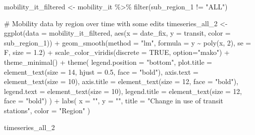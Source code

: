 \documentclass[
  letterpaper,
  DIV=11,
  numbers=noendperiod]{scrreprt}
\newenvironment{Shaded}{\begin{snugshade}}{\end{snugshade}}
\newcommand{\AttributeTok}[1]{\textcolor[rgb]{0.40,0.45,0.13}{#1}}
\newcommand{\CommentTok}[1]{\textcolor[rgb]{0.37,0.37,0.37}{#1}}
\newcommand{\ConstantTok}[1]{\textcolor[rgb]{0.56,0.35,0.01}{#1}}
\newcommand{\DecValTok}[1]{\textcolor[rgb]{0.68,0.00,0.00}{#1}}
\newcommand{\FloatTok}[1]{\textcolor[rgb]{0.68,0.00,0.00}{#1}}
\newcommand{\FunctionTok}[1]{\textcolor[rgb]{0.28,0.35,0.67}{#1}}
\newcommand{\NormalTok}[1]{\textcolor[rgb]{0.00,0.23,0.31}{#1}}
\newcommand{\OtherTok}[1]{\textcolor[rgb]{0.00,0.23,0.31}{#1}}
\newcommand{\SpecialCharTok}[1]{\textcolor[rgb]{0.37,0.37,0.37}{#1}}
\newcommand{\StringTok}[1]{\textcolor[rgb]{0.13,0.47,0.30}{#1}}
\begin{document}
\begin{Shaded}
\begin{Highlighting}[]
\NormalTok{mobility\_it\_filtered }\OtherTok{\textless{}{-}}\NormalTok{ mobility\_it }\SpecialCharTok{\%\textgreater{}\%} 
  \FunctionTok{filter}\NormalTok{(sub\_region\_1 }\SpecialCharTok{!=} \StringTok{"ALL"}\NormalTok{)}

\CommentTok{\# Mobility data by region over time with some edits}
\NormalTok{timeseries\_all\_2 }\OtherTok{\textless{}{-}} \FunctionTok{ggplot}\NormalTok{(}\AttributeTok{data =}\NormalTok{ mobility\_it\_filtered, }\FunctionTok{aes}\NormalTok{(}\AttributeTok{x =}\NormalTok{ date\_fix, }\AttributeTok{y =}\NormalTok{ transit, }\AttributeTok{color =}\NormalTok{ sub\_region\_1)) }\SpecialCharTok{+}
  \FunctionTok{geom\_smooth}\NormalTok{(}\AttributeTok{method =} \StringTok{"lm"}\NormalTok{, }\AttributeTok{formula =}\NormalTok{ y }\SpecialCharTok{\textasciitilde{}} \FunctionTok{poly}\NormalTok{(x, }\DecValTok{2}\NormalTok{), }\AttributeTok{se =}\NormalTok{ F, }\AttributeTok{size =} \FloatTok{1.2}\NormalTok{) }\SpecialCharTok{+}
  \FunctionTok{scale\_color\_viridis}\NormalTok{(}\AttributeTok{discrete =} \ConstantTok{TRUE}\NormalTok{, }\AttributeTok{option=}\StringTok{"mako"}\NormalTok{) }\SpecialCharTok{+}
  \FunctionTok{theme\_minimal}\NormalTok{() }\SpecialCharTok{+}
  \FunctionTok{theme}\NormalTok{(}
    \AttributeTok{legend.position =} \StringTok{"bottom"}\NormalTok{,}
    \AttributeTok{plot.title =} \FunctionTok{element\_text}\NormalTok{(}\AttributeTok{size =} \DecValTok{14}\NormalTok{, }\AttributeTok{hjust =} \FloatTok{0.5}\NormalTok{, }\AttributeTok{face =} \StringTok{"bold"}\NormalTok{),}
    \AttributeTok{axis.text =} \FunctionTok{element\_text}\NormalTok{(}\AttributeTok{size =} \DecValTok{10}\NormalTok{),}
    \AttributeTok{axis.title =} \FunctionTok{element\_text}\NormalTok{(}\AttributeTok{size =} \DecValTok{12}\NormalTok{, }\AttributeTok{face =} \StringTok{"bold"}\NormalTok{),}
    \AttributeTok{legend.text =} \FunctionTok{element\_text}\NormalTok{(}\AttributeTok{size =} \DecValTok{10}\NormalTok{),}
    \AttributeTok{legend.title =} \FunctionTok{element\_text}\NormalTok{(}\AttributeTok{size =} \DecValTok{12}\NormalTok{, }\AttributeTok{face =} \StringTok{"bold"}\NormalTok{)}
\NormalTok{  ) }\SpecialCharTok{+}
  \FunctionTok{labs}\NormalTok{(}
    \AttributeTok{x =} \StringTok{""}\NormalTok{,}
    \AttributeTok{y =} \StringTok{""}\NormalTok{,}
    \AttributeTok{title =} \StringTok{"Change in use of transit stations"}\NormalTok{,}
    \AttributeTok{color =} \StringTok{"Region"}
\NormalTok{  )}

\NormalTok{timeseries\_all\_2}
\end{Highlighting}
\end{Shaded}
\end{document}
